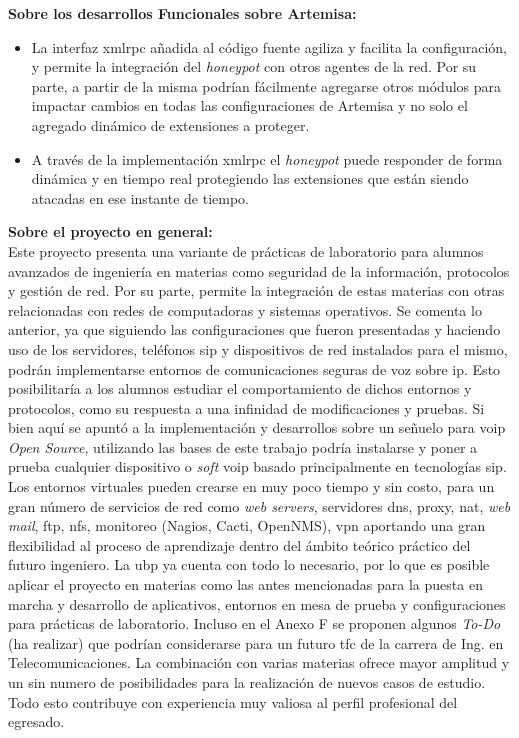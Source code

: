 \documentclass[a4paper,12pt]{report}
\begin{document}
\textbf{Sobre los desarrollos Funcionales sobre Artemisa:}

\begin{itemize}
\item{La interfaz \ac{xmlrpc} añadida al código fuente agiliza y facilita la
configuración, y permite la integración del \emph{honeypot} con otros agentes de la
red. Por su parte, a partir de la misma podrían fácilmente agregarse otros módulos para impactar
cambios en todas las configuraciones de Artemisa y no solo el agregado dinámico de extensiones 
a proteger.}

\item{A través de la implementación \ac{xmlrpc} el \emph{honeypot} puede responder 
de forma dinámica y en tiempo real protegiendo las extensiones que están siendo atacadas en ese 
instante de tiempo.}
\end{itemize}

\textbf{Sobre el proyecto en general:}\\

    Este proyecto presenta una variante de prácticas de laboratorio para alumnos avanzados
de ingeniería en materias como seguridad de la información, protocolos y gestión de red.
    Por su parte, permite la integración de estas materias con otras relacionadas con redes de computadoras
y sistemas operativos. Se comenta lo anterior, ya que siguiendo las configuraciones que fueron presentadas y 
haciendo uso de los servidores, teléfonos \ac{sip} y dispositivos de red instalados para el mismo, podrán
implementarse entornos de comunicaciones seguras de voz sobre \ac{ip}. Esto posibilitaría a los alumnos estudiar el comportamiento
de dichos entornos y
protocolos, como su respuesta a una infinidad de modificaciones y pruebas.
    Si bien aquí se apuntó a la implementación y desarrollos sobre un señuelo para \ac{voip} \emph{Open Source},
utilizando las bases de este trabajo podría instalarse y poner a prueba cualquier dispositivo o \emph{soft}
\ac{voip} basado principalmente en tecnologías \ac{sip}. Los entornos virtuales pueden crearse en muy poco
tiempo y sin costo, para un gran número de servicios de red como \emph{web servers}, servidores 
\ac{dns}, proxy, \ac{nat}, \emph{web mail}, \ac{ftp}, \ac{nfs}, monitoreo 
(Nagios, Cacti, OpenNMS), \ac{vpn} aportando una gran flexibilidad al proceso de aprendizaje 
dentro del ámbito teórico práctico del futuro ingeniero.
    La \ac{ubp} ya cuenta con todo lo necesario, por lo que es posible aplicar el proyecto
en materias como las antes mencionadas para la puesta en marcha y desarrollo de aplicativos, 
entornos en mesa de prueba y configuraciones para prácticas de laboratorio. Incluso en el Anexo F 
se proponen algunos \emph{To-Do} (ha realizar) que podrían considerarse para un futuro
\ac{tfc} de la carrera de Ing. en Telecomunicaciones. La combinación con
varias materias ofrece mayor amplitud y un sin numero de posibilidades para la realización de nuevos 
casos de estudio. Todo esto contribuye con experiencia muy valiosa al perfil
profesional del egresado.
\end{document}
